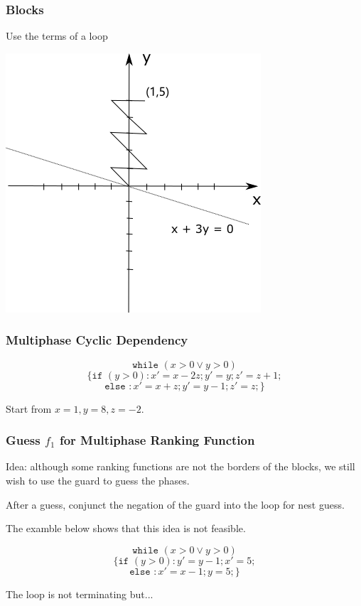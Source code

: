 \documentclass[11pt]{beamer}
\begin{document}
\begin{frame}\frametitle{Blocks}
Use the terms of a loop 
\begin{center}

\includegraphics[scale = 0.65]{jump.png}

\end{center}
\end{frame}

\begin{frame}\frametitle{Multiphase Cyclic Dependency}
\begin{example}

\[\texttt{while }(x > 0 \vee y > 0) \]
\[\{\texttt{if }(y > 0): x' = x - 2z; y' = y; z' = z + 1;\]
\[\texttt{else }: x' = x + z; y' = y - 1; z' = z;\}\]
\end{example}

Start from $x = 1, y = 8, z = -2$.



\end{frame}



\begin{frame}\frametitle{Guess $f_1$ for Multiphase Ranking Function}
Idea: although some ranking functions are not the borders of the blocks, we still wish to use the guard to guess the phases.

After a guess, conjunct the negation of the guard into the loop for nest guess.

The examble below shows that this idea is not feasible.
\begin{example}

\[\texttt{while }(x > 0 \vee y > 0) \]
\[\{\texttt{if }(y > 0): y' = y - 1; x' = 5;\]
\[\texttt{else }: x' = x - 1; y = 5; \}\]

\end{example}
The loop is not terminating but...
\end{frame}
\end{document}
